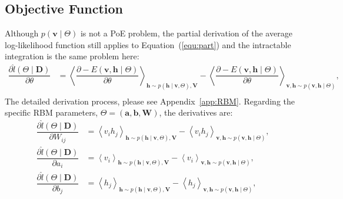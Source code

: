 \documentclass[11pt,twoside,a4paper]{article}
\begin{document}
\subsection{Objective Function}
	Although $ p(\mathbf{v} \mid \Theta) $ is not a PoE problem, the partial derivation of the average log-likelihood function still applies to Equation~(\ref{equ:part}) and the intractable integration is the same problem here:
	\begin{equation}
		\label{equ:RBM}
		\begin{aligned}
		\dfrac{\partial \hat{l} (\Theta \mid \mathbf{D})}{\partial \theta} 
		& = \left \langle \dfrac{\partial -E(\mathbf{v}, \mathbf{h} \mid \Theta)}{\partial \theta} \right \rangle_{\mathbf{h} \sim p( \mathbf{h} \mid \mathbf{v}, \Theta), \mathbf{V}} 
		- \left \langle \dfrac{\partial -E(\mathbf{v}, \mathbf{h} \mid \Theta)}{\partial \theta} \right \rangle_{\mathbf{v}, \mathbf{h} \sim p( \mathbf{v}, \mathbf{h} \mid  \Theta)},  \\
		\end{aligned}
	\end{equation}
	The detailed derivation process, please see Appendix~\ref{app:RBM}.
	Regarding the specific RBM parameters,  $ \Theta = (\mathbf{a}, \mathbf{b}, \mathbf{W}) $, the derivatives are:
	\begin{equation}
		\label{equ:RBM_2}
		\begin{aligned}
		\dfrac{\partial \hat{l} (\Theta \mid \mathbf{D})}{\partial W_{ij}} 
		& = \left \langle v_i h_j \right \rangle_{\mathbf{h} \sim p( \mathbf{h} \mid \mathbf{v}, \Theta), \mathbf{V}} 
		- \left \langle  v_i h_j \right \rangle_{\mathbf{v}, \mathbf{h} \sim p( \mathbf{v}, \mathbf{h} \mid  \Theta)},  \\
		\dfrac{\partial \hat{l} (\Theta \mid \mathbf{D})}{\partial a_{i}} 
		& = \left \langle v_i \right \rangle_{\mathbf{h} \sim p( \mathbf{h} \mid \mathbf{v}, \Theta), \mathbf{V}} 
		- \left \langle  v_i \right \rangle_{\mathbf{v}, \mathbf{h} \sim p( \mathbf{v}, \mathbf{h} \mid  \Theta)},  \\
		\dfrac{\partial \hat{l} (\Theta \mid \mathbf{D})}{\partial b_{j}} 
		& = \left \langle h_j \right \rangle_{\mathbf{h} \sim p( \mathbf{h} \mid \mathbf{v}, \Theta), \mathbf{V}} 
		- \left \langle  h_j \right \rangle_{\mathbf{v}, \mathbf{h} \sim p( \mathbf{v}, \mathbf{h} \mid  \Theta)},  \\
	\end{aligned}
	\end{equation}	 
	
\end{document}

